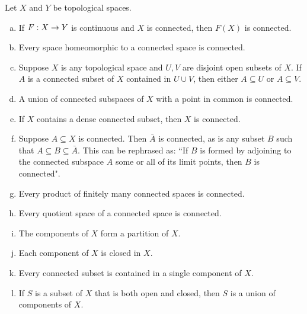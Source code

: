 \documentclass[11pt,a4paper]{article}
\begin{document}
\begin{prop}\label{prop:connectedness}
Let $X$ and $Y$ be topological spaces.
\begin{enumerate}[(a)]
    \item If $F:X\rightarrow Y$ is continuous and $X$ is connected, then $F(X)$ is connected.\label{prop:connectedness_a}
    \item {} Every space homeomorphic to a connected space is connected.\label{prop:connectedness_b}
    \item Suppose $X$ is any topological space and $U, V$ are disjoint open subsets of $X$. If $A$ is a connected subset of $X$ contained in $U\cup V$, then either $A\subseteq U$ or $A\subseteq V$.\label{prop:connectedness_c}
    \item A union of connected subspaces of $X$ with a point in common is connected.\label{prop:connectedness_d}
    \item If $X$ contains a dense connected subset, then $X$ is connected.\label{prop:connectedness_e}
    \item Suppose $A\subseteq X$ is connected. Then $\bar{A}$ is connected, as is any subset $B$ such that $A\subseteq B\subseteq \bar{A}$. This can be rephrased as: ``If $B$ is formed by adjoining to the connected subspace $A$ some or all of its limit points, then $B$ is connected".\label{prop:connectedness_f}
    \item Every product of finitely many connected spaces is connected.\label{prop:connectedness_g}
    \item Every quotient space of a connected space is connected.\label{prop:connectedness_h}
    \item The components of $X$ form a partition of $X$.\label{prop:connectedness_i}
    \item Each component of $X$ is closed in $X$.\label{prop:connectedness_j}
    \item Every connected subset is contained in a single component of $X$.\label{prop:connectedness_k}
    \item If $S$ is a subset of $X$ that is both open and closed, then $S$ is a union of components of $X$.\label{prop:connectedness_l}
\end{enumerate}
\end{prop}
\end{document}
